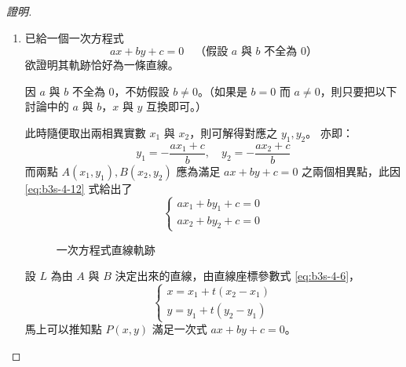 \begin{proof}[證明]
\begin{enumerate}[label=(\Roman*), leftmargin=2em]
  \item 已給一個一次方程式
  \[ ax + by + c = 0 \quad\text{（假設 $a$ 與 $b$ 不全為 0）} \]
  欲證明其軌跡恰好為一條直線。
  
  因 $a$ 與 $b$ 不全為 0，不妨假設 $b \neq 0$。（如果是 $b = 0$ 而 $a \neq 0$，則只要把以下討論中的 $a$ 與 $b$，$x$ 與 $y$ 互換即可。）
  
  此時隨便取出兩相異實數 $x_1$ 與 $x_2$，則可解得對應之 $y_1, y_2$。
  亦即：
  \begin{equation}
  y_1 = -\frac{a x_1 + c}{b}, \quad y_2 = -\frac{a x_2 + c}{b}
  \label{eq:b3s-4-12}
  \end{equation}
  而兩點 $A(x_1, y_1), B(x_2, y_2)$ 應為滿足 $ax + by + c = 0$ 之兩個相異點，此因 \eqref{eq:b3s-4-12} 式給出了
  \begin{equation}
  \begin{cases}
  a x_1 + b y_1 + c = 0 \\
  a x_2 + b y_2 + c = 0
  \end{cases}
  \label{eq:b3s-4-13}
  \end{equation}
  
  \begin{figure}[H]
  \centering
  \caption{一次方程式直線軌跡}
  \label{fig:4-22}
  \end{figure}
  
  設 $L$ 為由 $A$ 與 $B$ 決定出來的直線，由直線座標參數式 \eqref{eq:b3s-4-6}，
  \[ \begin{cases} x = x_1 + t(x_2 - x_1) \\ y = y_1 + t(y_2 - y_1) \end{cases} \]
  馬上可以推知點 $P(x, y)$ 滿足一次式 $ax + by + c = 0$。
  

\end{enumerate}
\end{proof}
